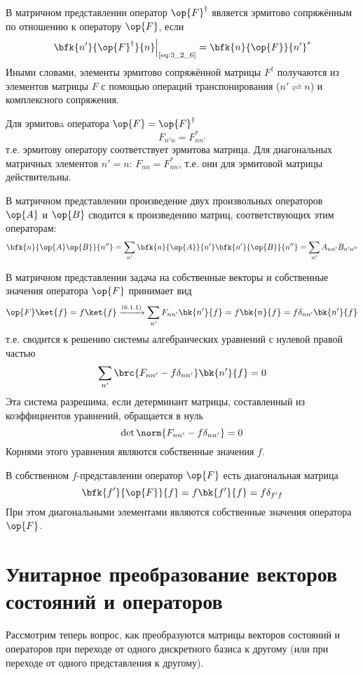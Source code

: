 В матричном представлении оператор $\op{F}^\dag$ является эрмитово сопряжённым по отношению к оператору $\op{F}$, если
$$
\left .\bfk{n'}{\op{F}^\dag}{n}\right|_{\text{\eqref{eq:3_2_6}}} = \bfk{n}{\op{F}}{n'}^*
$$%
%
Иными словами, элементы эрмитово сопряжённой матрицы $F^\dag$ получаются из элементов матрицы $F$ с помощью операций транспонирования ($n' \rightleftharpoons n $) и комплексного сопряжения.

Для эрмитовa оператора $\op{F} = \op{F}^\dag$
$$
F_{n'n}=F_{nn'}^*
$$%
%
т.е. эрмитову оператору соответствует эрмитова матрица. Для диагональных матричных элементов $n' = n$: $F_{nn} = F^*_{nn}$, т.е. они для эрмитовой матрицы действительны.

В матричном представлении произведение двух произвольных операторов $\op{A}$ и $\op{B}$ сводится к произведению матриц, соответствующих этим операторам:%
$$
\bfk{n}{\op{A}\op{B}}{n''} =
	\sum_{n'} \bfk{n}{\op{A}}{n'} \bfk{n'}{\op{B}}{n''} =
	\sum_{n'} A_{nn'} B_{n'n''}
$$

В матричном представлении задача на собственные векторы и собственные значения оператора $\op{F}$ принимает вид%
$$
\op{F}\ket{f}=f\ket{f} \xrightarrow{(6.1.1)} \sum_{n'} F_{nn'} \bk{n'}{f} = f\bk{n}{f}=f\delta_{nn'}\bk{n'}{f}
$$%
%
т.е. сводится к решению системы алгебраических уравнений с нулевой правой частью%
%
$$
\sum_{n'}\brc{F_{nn'}-f\delta_{nn'}}\bk{n'}{f}=0
$$%
%
Эта система разрешима, если детерминант матрицы, составленный из коэффициентов уравнений, обращается в нуль%
%
$$
\det{\norm{F_{nn'}-f\delta_{nn'}}}=0
$$%
%
Корнями этого уравнения являются собственные значения $f$.

В собственном $f$-представлении оператор $\op{F}$ есть диагональная матрица%
%
$$
\bfk{f'}{\op{F}}{f}=f\bk{f'}{f}=f\delta_{f'f}
$$%
%
При этом диагональными элементами являются собственные значения оператора $\op{F}$.


\section{Унитарное преобразование векторов состояний и операторов}

Рассмотрим теперь вопрос, как преобразуются матрицы векторов состояний и операторов при переходе от одного дискретного базиса к другому (или при переходе от одного представления к другому).

